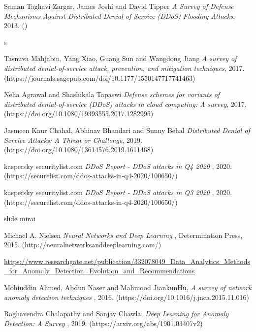 \begin{thebibliography}{9}
     Saman Taghavi Zargar, James Joshi and David Tipper {\em A Survey of Defense Mechanisms Against Distributed Denial of Service (DDoS) Flooding Attacks}, 2013. ()

     s

     Tasnuva Mahjabin, Yang Xiao, Guang Sun and Wangdong Jiang {\em A survey of distributed denial-of-service attack, prevention, and mitigation techniques}, 2017. (https://journals.sagepub.com/doi/10.1177/1550147717741463)

     Neha Agrawal and Shashikala Tapaswi {\em Defense schemes for variants of distributed denial-of-service (DDoS) attacks in cloud
    computing: A survey}, 2017. (https://doi.org/10.1080/19393555.2017.1282995)

     Jasmeen Kaur Chahal, Abhinav Bhandari and Sunny Behal {\em Distributed Denial of Service Attacks: A Threat or Challenge}, 2019. (https://doi.org/10.1080/13614576.2019.1611468)

     kaspersky securitylist.com {\em DDoS Report - DDoS attacks in Q4 2020
    }, 2020. (https://securelist.com/ddos-attacks-in-q4-2020/100650/)
  
     kaspersky securitylist.com {\em DDoS Report - DDoS attacks in Q3 2020
    }, 2020. (https://securelist.com/ddos-attacks-in-q4-2020/100650/)    

     slide mirai

     Michael A. Nielsen  {\em Neural Networks and Deep Learning }, Determination Press, 2015. (http://neuralnetworksanddeeplearning.com/)   

     \url{https://www.researchgate.net/publication/332078049_Data_Analytics_Methods_for_Anomaly_Detection_Evolution_and_Recommendations}


    
      Mohiuddin Ahmed, Abdun Naser and Mahmood JiankunHu, {\em A survey of network anomaly detection techniques }, 2016. (https://doi.org/10.1016/j.jnca.2015.11.016)

     Raghavendra Chalapathy and  Sanjay Chawla, {\em Deep Learning for Anomaly Detection: A Survey }, 2019. (https://arxiv.org/abs/1901.03407v2)
    

\end{thebibliography}
